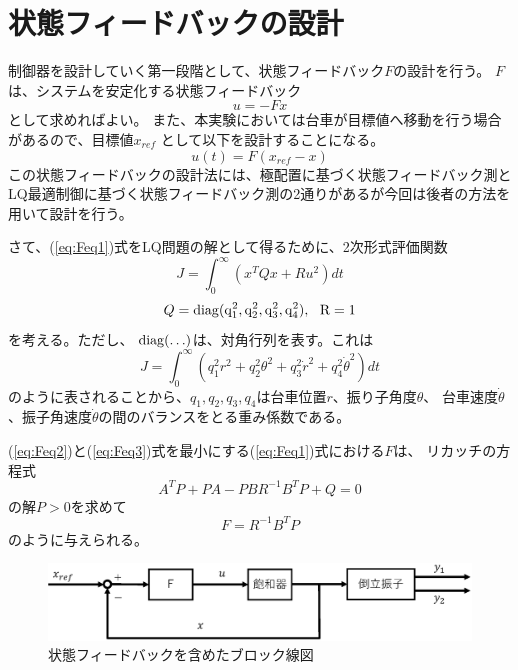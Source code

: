 \section{状態フィードバックの設計}
	制御器を設計していく第一段階として、状態フィードバック$F$の設計を行う。
	$F$は、システムを安定化する状態フィードバック
	\[
		u = -Fx
	\]
	として求めればよい。
	また、本実験においては台車が目標値へ移動を行う場合があるので、目標値$x_{ref}$
	として以下を設計することになる。
	\begin{equation}
		u(t) = F(x_{ref} - x)
		\label{eq:Feq1}
	\end{equation}
	この状態フィードバックの設計法には、極配置に基づく状態フィードバック測と
	LQ最適制御に基づく状態フィードバック測の2通りがあるが今回は後者の方法を用いて設計を行う。
	\par
	さて、(\ref{eq:Feq1})式をLQ問題の解として得るために、2次形式評価関数
	\begin{equation}
		J = \int_{0}^{\infty}(x^{T}Qx+Ru^{2})dt
		\label{eq:Feq2}
	\end{equation}
	\begin{equation}
		Q = \rm{diag}(q_{1}^2,q_{2}^2,q_{3}^2,q_{4}^2),\ \ R = 1
		\label{eq:Feq3}
	\end{equation}
	を考える。ただし、 $\rm{diag}(\ldots)$は、対角行列を表す。これは
	\begin{equation}
		J=\int_{0}^{\infty}(q_{1}^{2}r^{2}+q_{2}^{2}\theta^{2}
		+q_{3}^{2}\dot{r}^{2}+q_{4}^{2}\dot{\theta}^{2})dt
	\end{equation}
	のように表されることから、$q_1,q_2,q_3,q_4$は台車位置$r$、振り子角度$\theta$、
	台車速度$\dot{\theta}$、振子角速度$\dot{\theta}$の間のバランスをとる重み係数である。
	\par
	(\ref{eq:Feq2})と(\ref{eq:Feq3})式を最小にする(\ref{eq:Feq1})式における$F$は、
	リカッチの方程式
	\[
		A^{T}P+PA-PBR^{-1}B^{T}P+Q = 0
	\]
	の解$P>0$を求めて
	\[
		F = R^{-1}B^{T}P
	\]
	のように与えられる。
	\begin{figure}[h]
		\centering
		\includegraphics[width=0.8\linewidth]{gazo/controll_F.eps}
		\caption{状態フィードバックを含めたブロック線図}
		\label{image:cF}
	\end{figure}

